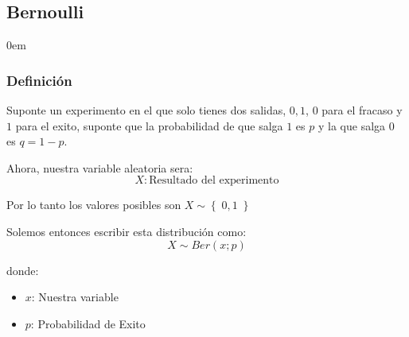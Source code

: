 \documentclass[12pt, fleqn]{report}                             %
\newenvironment{SmallIndentation}[1][0.75em]                    %
        {\begin{adjustwidth}{#1}{}\begin{footnotesize}}             %
        {\end{footnotesize}\end{adjustwidth}}                       %
\theoremstyle{break}                                            %
\newcommand{\Set}[1]            {\left\{ \; #1 \; \right\}}     %
\begin{document}
            \subsection{Bernoulli}

                \begin{multicols}{2}
                \begin{SmallIndentation}[0em]

                    \subsubsection{Definición}

                        Suponte un experimento en el que solo tienes dos salidas, 
                        $0, 1$, $0$ para el fracaso y $1$ para el exito,
                        suponte que la probabilidad de que salga $1$ es $p$
                        y la que salga $0$ es $q = 1 - p$.

                        Ahora, nuestra variable aleatoria sera:
                        \begin{equation*}
                            X : \text{Resultado del experimento}
                        \end{equation*}

                        Por lo tanto los valores posibles son $X \sim \Set{0, 1}$

                        Solemos entonces escribir esta distribución como:
                        \begin{equation*}
                            X \sim Ber(x; p)
                        \end{equation*}

                        donde:
                        \begin{itemize}
                            \item $x$: Nuestra variable
                            \item $p$: Probabilidad de Exito
                        \end{itemize}



\end{SmallIndentation}
\end{multicols}
\end{document}
